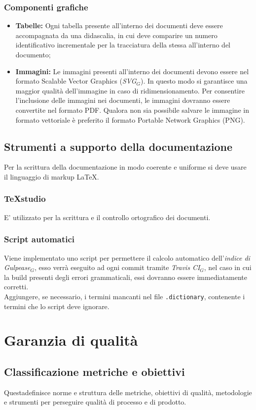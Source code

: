 \subsubsection{Componenti grafiche}
	\begin{itemize}
	\item \textbf{Tabelle:} 
	Ogni tabella presente all'interno dei documenti deve essere accompagnata da una didascalia,	in cui deve comparire un numero identificativo incrementale per la tracciatura della stessa all'interno del documento;
	\item \textbf{Immagini:}
	Le immagini presenti all'interno dei documenti devono essere nel formato Scalable Vector Graphics (\textit{SVG$_{G}$}). In questo modo si garantisce una maggior qualità dell'immagine in caso di ridimensionamento. Per consentire l’inclusione delle immagini nei documenti,
	le immagini dovranno essere convertite nel formato PDF. Qualora non sia possibile
	salvare le immagine in formato vettoriale è preferito il formato Portable Network
	Graphics (PNG).
	\end{itemize}
\subsection{Strumenti a supporto della documentazione}
Per la scrittura della documentazione in modo coerente e uniforme si deve usare il linguaggio di markup \LaTeX.
\subsubsection{TeXstudio}
E' utilizzato per la scrittura e il controllo ortografico dei documenti.
\subsubsection{Script automatici}
Viene implementato uno script per permettere il calcolo automatico dell'\textit{indice di Gulpease$_{G}$}, esso verrà eseguito ad ogni commit tramite \textit{Travis CI$_{G}$}, nel caso in cui la build presenti degli errori grammaticali, essi dovranno essere immediatamente corretti.\\
Aggiungere, se necessario, i termini mancanti nel file \texttt{.dictionary}, contenente i termini che lo script deve ignorare.

\section{Garanzia di qualità}
\subsection{Classificazione metriche e obiettivi}
Questadefinisce norme e struttura delle metriche, obiettivi di qualità, metodologie e strumenti per perseguire qualità di processo e di prodotto. 
